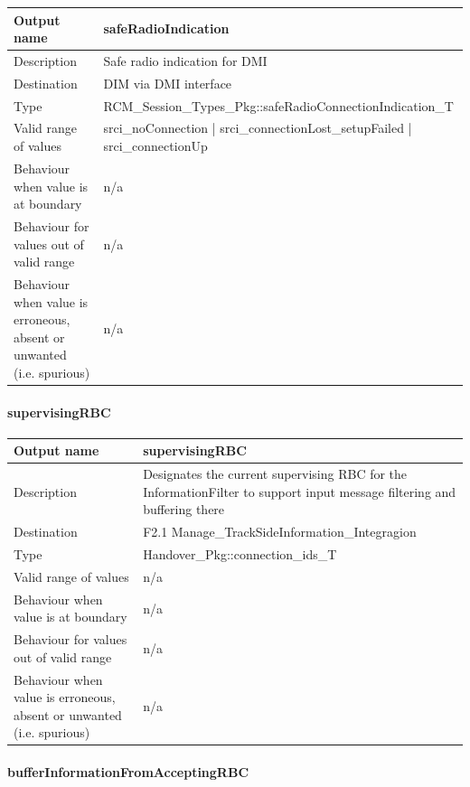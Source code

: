 \begin{longtable}{p{}p{}}
	\toprule
	Output name				& safeRadioIndication \\
	\midrule
	Description				& Safe radio indication for DMI  \\
	\midrule
	Destination				& DIM via DMI interface \\ 
	\midrule
	Type					& RCM\_Session\_Types\_Pkg::safeRadioConnectionIndication\_T \\
	\midrule
	Valid range of values	& srci\_noConnection | srci\_connectionLost\_setupFailed | srci\_connectionUp \\
	\midrule
	Behaviour when value is at boundary	& n/a \\
	\midrule
	Behaviour for values out of valid range	& n/a \\
	\midrule
	Behaviour when value is erroneous, absent or unwanted (i.e. spurious) & n/a \\
	\bottomrule
\end{longtable}

\paragraph{supervisingRBC}

\begin{longtable}{p{}p{}}
	\toprule
	Output name				& supervisingRBC \\
	\midrule
	Description				& Designates the current supervising RBC for the InformationFilter to support input message filtering and buffering there \\
	\midrule
	Destination				& F2.1 Manage\_TrackSideInformation\_Integragion \\ 
	\midrule
	Type					& Handover\_Pkg::connection\_ids\_T \\
	\midrule
	Valid range of values	& n/a \\
	\midrule
	Behaviour when value is at boundary	& n/a \\
	\midrule
	Behaviour for values out of valid range	& n/a \\
	\midrule
	Behaviour when value is erroneous, absent or unwanted (i.e. spurious) & n/a \\
	\bottomrule
\end{longtable}

\paragraph{bufferInformationFromAcceptingRBC}

